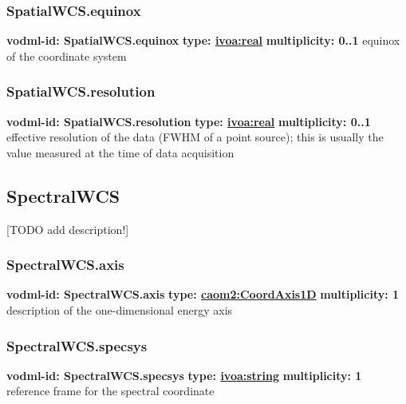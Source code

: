     \subsubsection{SpatialWCS.equinox}
      \textbf{vodml-id: SpatialWCS.equinox} \newline
      \textbf{type: \hyperref[sect:ivoa]{ivoa:real}} \newline
      \textbf{multiplicity: 0..1} \newline
      equinox of the coordinate system

    \subsubsection{SpatialWCS.resolution}
      \textbf{vodml-id: SpatialWCS.resolution} \newline
      \textbf{type: \hyperref[sect:ivoa]{ivoa:real}} \newline
      \textbf{multiplicity: 0..1} \newline
      effective resolution of the data (FWHM of a point source); this is usually the value measured at the time of data acquisition

  \subsection{SpectralWCS}
  \label{sect:SpectralWCS}
    [TODO add description!]

    \subsubsection{SpectralWCS.axis}
      \textbf{vodml-id: SpectralWCS.axis} \newline
      \textbf{type: \hyperref[sect:CoordAxis1D]{caom2:CoordAxis1D}} \newline
      \textbf{multiplicity: 1} \newline
      description of the one-dimensional energy axis

    \subsubsection{SpectralWCS.specsys}
      \textbf{vodml-id: SpectralWCS.specsys} \newline
      \textbf{type: \hyperref[sect:ivoa]{ivoa:string}} \newline
      \textbf{multiplicity: 1} \newline
      reference frame for the spectral coordinate

